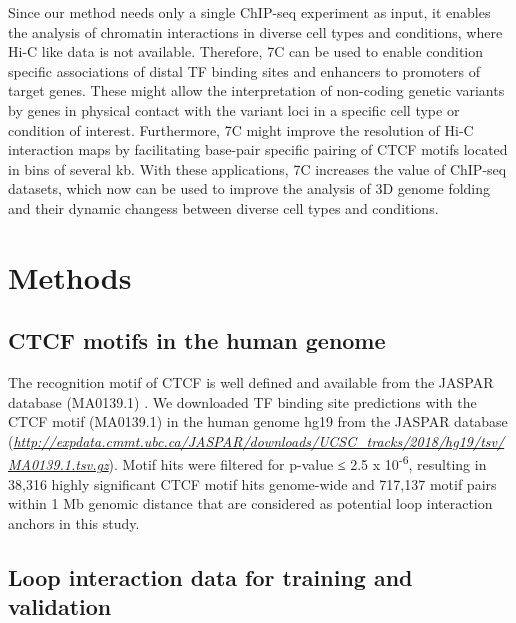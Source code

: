 \documentclass[a4paper,twoside=true,openright,parskip=full,chapterprefix=true,11pt,headings=normal,bibliography=totoc,listof=totoc,titlepage=on,captions=tableabove,draft=false]{scrreprt}
\theoremstyle{definition}
\theoremstyle{definition}
\theoremstyle{definition}
\theoremstyle{remark}
\begin{document}
Since our method needs only a single ChIP-seq experiment as input, it
enables the analysis of chromatin interactions in diverse cell types and
conditions, where Hi-C like data is not available. Therefore, 7C can be
used to enable condition specific associations of distal TF binding
sites and enhancers to promoters of target genes. These might allow the
interpretation of non-coding genetic variants by genes in physical
contact with the variant loci in a specific cell type or condition of
interest. Furthermore, 7C might improve the resolution of Hi-C
interaction maps by facilitating base-pair specific pairing of CTCF
motifs located in bins of several kb. With these applications, 7C
increases the value of ChIP-seq datasets, which now can be used to
improve the analysis of 3D genome folding and their dynamic changess
between diverse cell types and conditions.

\hypertarget{methods-1}{%
\section{Methods}\label{methods-1}}

\hypertarget{ctcf-motifs-in-the-human-genome}{%
\subsection{CTCF motifs in the human
genome}\label{ctcf-motifs-in-the-human-genome}}

The recognition motif of CTCF is well defined and available from the
JASPAR database (MA0139.1) \citep{Mathelier2015}. We downloaded TF
binding site predictions with the CTCF motif (MA0139.1) in the human
genome hg19 from the JASPAR database
(\href{http://expdata.cmmt.ubc.ca/JASPAR/downloads/UCSC_tracks/2018/hg19/tsv/MA0139.1.tsv.gz}{\emph{http://expdata.cmmt.ubc.ca/JASPAR/downloads/UCSC\_tracks/2018/hg19/tsv/MA0139.1.tsv.gz}}).
Motif hits were filtered for p-value ≤ 2.5 x 10\textsuperscript{-6},
resulting in 38,316 highly significant CTCF motif hits genome-wide and
717,137 motif pairs within 1 Mb genomic distance that are considered as
potential loop interaction anchors in this study.

\hypertarget{loop-interaction-data-for-training-and-validation}{%
\subsection{Loop interaction data for training and
validation}\label{loop-interaction-data-for-training-and-validation}}
\end{document}
